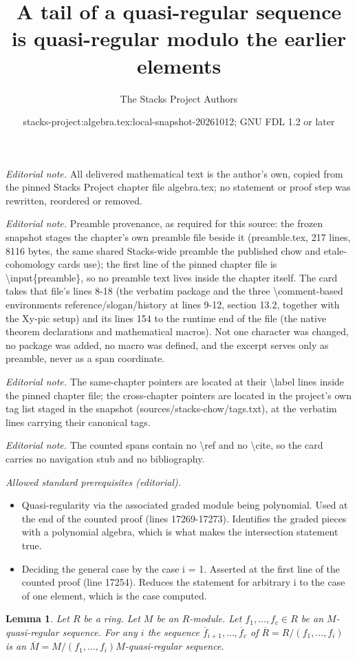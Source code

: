 \documentclass[10pt,a4paper]{amsart}
\title{A tail of a quasi-regular sequence is quasi-regular modulo the earlier elements}
\author{The Stacks Project Authors}
\date{stacks-project:algebra.tex:local-snapshot-20261012; GNU FDL 1.2 or later}
\theoremstyle{plain}
\newtheorem{lemma}[subsection]{Lemma}
\theoremstyle{definition}
\theoremstyle{remark}
\numberwithin{equation}{subsection}
\begin{document}
\maketitle
\noindent\textit{Editorial note.} All delivered mathematical text is the author's own, copied from the pinned Stacks Project chapter file algebra.tex; no statement or proof step was rewritten, reordered or removed.\par\medskip
\noindent\textit{Editorial note.} Preamble provenance, as required for this source: the frozen snapshot stages the chapter's own preamble file beside it (preamble.tex, 217 lines, 8116 bytes, the same shared Stacks-wide preamble the published chow and etale-cohomology cards use); the first line of the pinned chapter file is \textbackslash{}input\{preamble\}, so no preamble text lives inside the chapter itself. The card takes that file's lines 8-18 (the verbatim package and the three \textbackslash{}comment-based environments reference/slogan/history at lines 9-12, section 13.2, together with the Xy-pic setup) and its lines 154 to the runtime end of the file (the native theorem declarations and mathematical macros). Not one character was changed, no package was added, no macro was defined, and the excerpt serves only as preamble, never as a span coordinate.\par\medskip
\noindent\textit{Editorial note.} The same-chapter pointers are located at their \textbackslash{}label lines inside the pinned chapter file; the cross-chapter pointers are located in the project's own tag list staged in the snapshot (sources/stacks-chow/tags.txt), at the verbatim lines carrying their canonical tags.\par\medskip
\noindent\textit{Editorial note.} The counted spans contain no \textbackslash{}ref and no \textbackslash{}cite, so the card carries no navigation stub and no bibliography.\par\medskip
\noindent\textit{Allowed standard prerequisites (editorial).}\begin{itemize}
\item Quasi-regularity via the associated graded module being polynomial. Used at the end of the counted proof (lines 17269-17273). Identifies the graded pieces with a polynomial algebra, which is what makes the intersection statement true.
\item Deciding the general case by the case i = 1. Asserted at the first line of the counted proof (line 17254). Reduces the statement for arbitrary i to the case of one element, which is the case computed.
\end{itemize}\medskip
\begin{lemma}
\label{lemma-truncate-quasi-regular}
Let $R$ be a ring. Let $M$ be an $R$-module.
Let $f_1, \ldots, f_c \in R$ be an $M$-quasi-regular sequence.
For any $i$ the sequence
$\overline{f}_{i + 1}, \ldots, \overline{f}_c$
of $\overline{R} = R/(f_1, \ldots, f_i)$ is an
$\overline{M} = M/(f_1, \ldots, f_i)M$-quasi-regular sequence.
\end{lemma}
\end{document}
